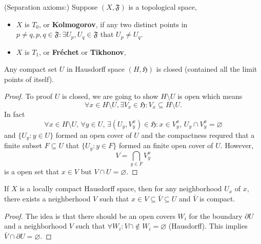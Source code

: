 \begin{definition}(Separation axioms:)
Suppose $(X,\mathfrak{F})$ is a topological space,
\begin{itemize}
\item $X$ is $T_0$, or \textbf{Kolmogorov}, if any two distinct points in $p\ne q,p,q\in\mathfrak{F}: \exists U_p,U_q\in\mathfrak{F}$ that $U_p\ne U_q$.
\item $X$ is $T_1$, or \textbf{Fr\'{e}chet} or \textbf{Tikhonov},  
\end{itemize}
\end{definition}

\begin{theorem}
Any compact set $U$ in Hausdorff space $(H,\mathfrak{H})$ is closed (contained all the limit points of itself).
\end{theorem}

\begin{proof}
To proof $U$ is closed, we are going to show $H\setminus U$ is open which means
\begin{equation}
\forall x\in H\setminus U, \exists V_x\in\mathfrak{H}: V_x\subseteq H\setminus U.
\end{equation}
In fact
\begin{equation}
\forall x\in H\setminus U,\,\forall y\in U,\,\exists (U_y,V_y^x)\in\mathfrak{H}: x\in V_y^x,\,U_y\cap V_y^x=\varnothing
\end{equation}
and $\{U_y:y\in U\}$ formed an open cover of $U$ and the compactness requred that a finite subset $F\subseteq U$ that $\{U_y:y\in F\}$ formed an finite open cover of $U$. However, 
\begin{equation}
V=\bigcap_{y\in F}V_y^x
\end{equation}
is a open set that $x\in V$ but $V\cap U=\varnothing$.
\end{proof}

\begin{theorem}
If $X$ is a locally compact Hausdorff space, then for any neighborhood $U_x$ of $x$, there exists a neighberhood $V$ such that $x\in V\subseteq\bar V\subseteq U$ and $\bar V$ is compact.
\end{theorem}
\begin{proof}
The idea is that there should be an open covers ${W_i}$ for the boundary $\partial U$ and a neighborhood $V$ such that $\forall W_i: V\cap\notin W_i=\varnothing$ (Hausdorff). This implies $\bar V\cap \partial U=\varnothing$.  
\end{proof}